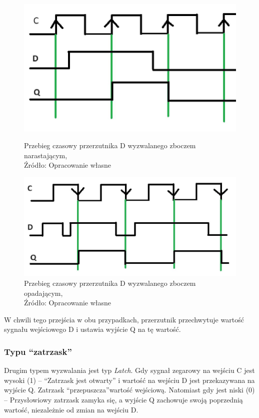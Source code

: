 \documentclass{article}
\begin{document}
        \begin{figure}[!ht]
          \begin{minipage}{.5\textwidth}
            \centering
            \includegraphics[scale=0.25]{grafiki/narastajace.jpg}
            \caption{Przebieg czasowy przerzutnika D wyzwalanego zboczem narastającym,
            \\Źródło: Opracowanie własne}
          \end{minipage}
          \begin{minipage}{.5\textwidth}
            \centering
            \includegraphics[scale=0.25]{grafiki/opadajace.jpg}
            \caption{Przebieg czasowy przerzutnika D wyzwalanego zboczem opadającym,
            \\Źródło: Opracowanie własne}
          \end{minipage}
        \end{figure}

        W chwili tego przejścia w obu przypadkach, przerzutnik przechwytuje wartość sygnału wejściowego D i ustawia wyjście Q na tę wartość.

        \pagebreak

      \subsubsection{Typu \textquotedblleft zatrzask\textquotedblright}
      Drugim typem wyzwalania jest typ \textit{Latch}.
      Gdy sygnał zegarowy na wejściu C jest wysoki (1) -- \textquotedblleft Zatrzask jest otwarty\textquotedblright \mbox{}  i wartość na wejściu D jest przekazywana na wyjście Q. Zatrzask \textquotedblleft przepuszcza\textquotedblright \mbox{}wartość wejściową.
      Natomiast gdy jest niski (0) -- Przysłowiowy zatrzask zamyka się, a wyjście Q zachowuje swoją poprzednią wartość, niezależnie od zmian na wejściu D.
\end{document}
